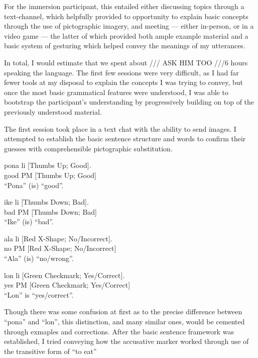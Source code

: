\documentclass[a4paper,10pt]{article}
\begin{document}
For the immersion participant, this entailed either discussing topics through a text-channel, which
helpfully provided to opportunity to explain basic concepts through the use of pictographic imagery,
and meeting --- either in-person, or in a video game --- the latter of which provided both ample
example material and a basic system of gesturing which helped convey the meanings of my utterances.

In total, I would estimate that we spent about /// ASK HIM TOO ///6 hours speaking the language. The first few sessions
were very difficult, as I had far fewer tools at my disposal to explain the concepts I was trying to
convey, but once the most basic grammatical features were understood, I was able to bootstrap the
participant's understanding by progressively building on top of the previously understood material.

The first session took place in a text chat with the ability to send images. I attempted to establish
the basic sentence structure and words to confirm their guesses with comprehensible pictographic
substitution.

\begin{exe}
 \ex
 \gll pona li [Thumbs Up; Good]. \\
 good PM [Thumbs Up; Good] \\
 \glt ``Pona'' (is) ``good''.
\end{exe}
\begin{exe}
 \ex
 \gll ike li [Thumbs Down; Bad]. \\
 bad PM [Thumbs Down; Bad] \\
 \glt ``Ike'' (is) ``bad''.
\end{exe}
\begin{exe}
 \ex
 \gll ala li [Red X-Shape; No/Incorrect]. \\
 no PM [Red X-Shape; No/Incorrect] \\
 \glt ``Ala'' (is) ``no/wrong''.
\end{exe}
\begin{exe}
 \ex
 \gll lon li [Green Checkmark; Yes/Correct]. \\
 yes PM [Green Checkmark; Yes/Correct] \\
 \glt ``Lon'' is ``yes/correct''.
\end{exe}

Though there was some confusion at first as to the precise difference between ``pona'' and ``lon'',
this distinction, and many similar ones, would be cemented through exmaples and corrections. After
the basic sentence framework was established, I tried conveying how the accusative marker worked
through use of the transitive form of ``to eat''
\end{document}

